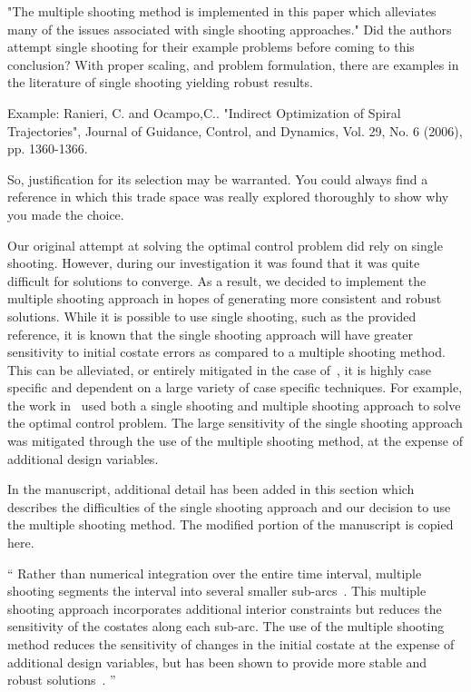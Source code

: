 \documentclass[11pt]{article}
\newenvironment{correction}{\begin{list}{}{\setlength{\leftmargin}{1cm}\setlength{\rightmargin}{1cm}}\vspace{\parsep}\item[]``}{''\end{list}}
\begin{document}
\begin{enumerate}
\item
    \begin{itshape}
"The multiple shooting method is implemented in this paper which alleviates many of the issues associated with single shooting approaches."  Did the authors attempt single shooting for their example problems before coming to this conclusion?  With proper scaling, and problem formulation, there are examples in the literature of single shooting yielding robust results.  

Example: 
Ranieri, C. and Ocampo,C..  "Indirect Optimization of Spiral Trajectories", Journal of Guidance, Control, and Dynamics, Vol. 29, No. 6 (2006), pp. 1360-1366.

So, justification for its selection may be warranted.  You could always find a reference in which this trade space was really explored thoroughly to show why you made the choice.
\end{itshape}

Our original attempt at solving the optimal control problem did rely on single shooting.
However, during our investigation it was found that it was quite difficult for solutions to converge.
As a result, we decided to implement the multiple shooting approach in hopes of generating more consistent and robust solutions.
While it is possible to use single shooting, such as the provided reference, it is known that the single shooting approach will have greater sensitivity to initial costate errors as compared to a multiple shooting method.
This can be alleviated, or entirely mitigated in the case of~\cite{ranieri2006}, it is highly case specific and dependent on a large variety of case specific techniques. 
For example, the work in~\cite{ozimek2010a} used both a single shooting and multiple shooting approach to solve the optimal control problem.
The large sensitivity of the single shooting approach was mitigated through the use of the multiple shooting method, at the expense of additional design variables.

In the manuscript, additional detail has been added in this section which describes the difficulties of the single shooting approach and our decision to use the multiple shooting method.
The modified portion of the manuscript is copied here.
\begin{correction}
Rather than numerical integration over the entire time interval, multiple shooting segments the interval into several smaller sub-arcs~\cite{stoer2013}.
This multiple shooting approach incorporates additional interior constraints but reduces the sensitivity of the costates along each sub-arc.
The use of the multiple shooting method reduces the sensitivity of changes in the initial costate at the expense of additional design variables, but has been shown to provide more stable and robust solutions~\cite{ozimek2010a}.
\end{correction}


\end{enumerate}
\end{document}
